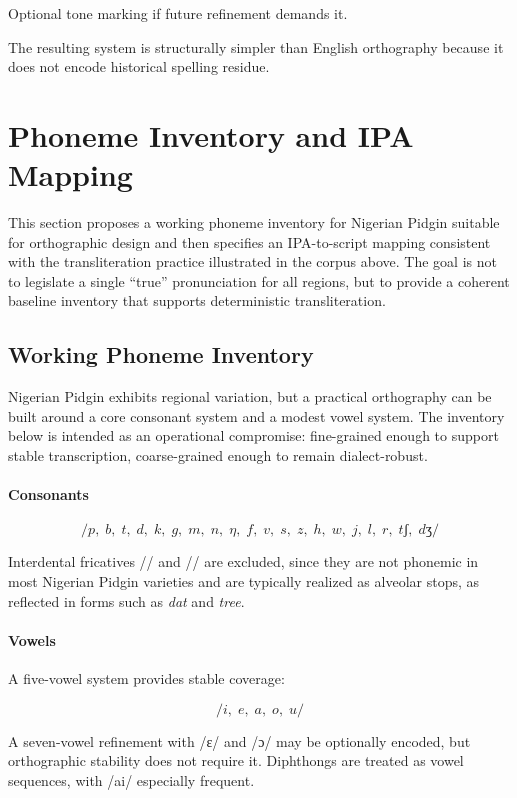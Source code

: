 \documentclass[12pt]{article}
\begin{document}
Optional tone marking if future refinement demands it.

The resulting system is structurally simpler than English orthography because it does not encode historical spelling residue.

\section{Phoneme Inventory and IPA Mapping}

This section proposes a working phoneme inventory for Nigerian Pidgin suitable for orthographic design and then specifies an IPA-to-script mapping consistent with the transliteration practice illustrated in the corpus above. The goal is not to legislate a single ``true'' pronunciation for all regions, but to provide a coherent baseline inventory that supports deterministic transliteration.

\subsection{Working Phoneme Inventory}

Nigerian Pidgin exhibits regional variation, but a practical orthography can be built around a core consonant system and a modest vowel system. The inventory below is intended as an operational compromise: fine-grained enough to support stable transcription, coarse-grained enough to remain dialect-robust.

\paragraph{Consonants}

\[
/p,\; b,\; t,\; d,\; k,\; g,\;
m,\; n,\; \eta,\;
f,\; v,\; s,\; z,\; h,\;
w,\; j,\;
l,\; r,\;
tʃ,\; dʒ/
\]

Interdental fricatives /\texttheta/ and /\dh/ are excluded, since they are not phonemic in most Nigerian Pidgin varieties and are typically realized as alveolar stops, as reflected in forms such as \textit{dat} and \textit{tree}.

\paragraph{Vowels}

A five-vowel system provides stable coverage:

\[
/i,\; e,\; a,\; o,\; u/
\]

A seven-vowel refinement with /ɛ/ and /ɔ/ may be optionally encoded, but orthographic stability does not require it. Diphthongs are treated as vowel sequences, with /ai/ especially frequent.
\end{document}
